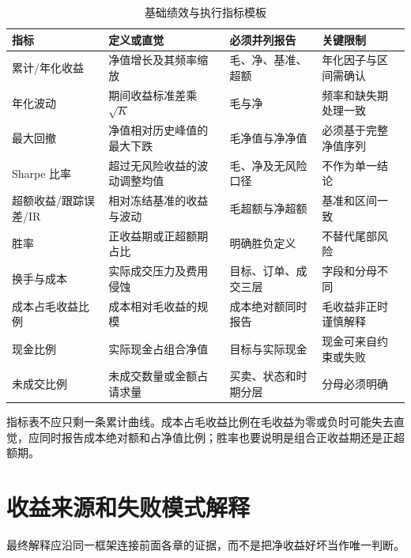 \begin{table}[htbp]
  \centering
  \footnotesize
  \caption{基础绩效与执行指标模板}
  \label{tab:ch10-performance-metrics}
  \begin{tabularx}{\textwidth}{p{2.7cm} p{4.5cm} p{3.4cm} Y}
    \toprule
    指标 & 定义或直觉 & 必须并列报告 & 关键限制 \\
    \midrule
    累计/年化收益 & 净值增长及其频率缩放 & 毛、净、基准、超额 & 年化因子与区间需确认 \\
    年化波动 & 期间收益标准差乘 \(\sqrt K\) & 毛与净 & 频率和缺失期处理一致 \\
    最大回撤 & 净值相对历史峰值的最大下跌 & 毛净值与净净值 & 必须基于完整净值序列 \\
    Sharpe 比率 & 超过无风险收益的波动调整均值 & 毛、净及无风险口径 & 不作为单一结论 \\
    超额收益/跟踪误差/IR & 相对冻结基准的收益与波动 & 毛超额与净超额 & 基准和区间一致 \\
    胜率 & 正收益期或正超额期占比 & 明确胜负定义 & 不替代尾部风险 \\
    换手与成本 & 实际成交压力及费用侵蚀 & 目标、订单、成交三层 & 字段和分母不同 \\
    成本占毛收益比例 & 成本相对毛收益的规模 & 成本绝对额同时报告 & 毛收益非正时谨慎解释 \\
    现金比例 & 实际现金占组合净值 & 目标与实际现金 & 现金可来自约束或失败 \\
    未成交比例 & 未成交数量或金额占请求量 & 买卖、状态和时期分层 & 分母必须明确 \\
    \bottomrule
  \end{tabularx}
\end{table}

指标表不应只剩一条累计曲线。成本占毛收益比例在毛收益为零或负时可能失去直觉，应同时报告成本绝对额和占净值比例；胜率也要说明是组合正收益期还是正超额期。

\section{收益来源和失败模式解释}

最终解释应沿同一框架连接前面各章的证据，而不是把净收益好坏当作唯一判断。

